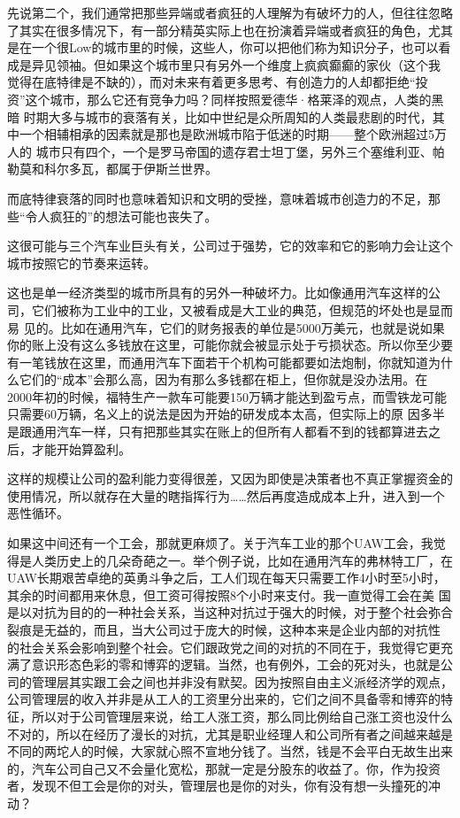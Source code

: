 先说第二个，我们通常把那些异端或者疯狂的人理解为有破坏力的人，但往往忽略了其实在很多情况下，有一部分精英实际上也在扮演着异端或者疯狂的角色，尤其
是在一个很Low的城市里的时候，这些人，你可以把他们称为知识分子，也可以看成是异见领袖。但如果这个城市里只有另外一个维度上疯疯癫癫的家伙（这个我
觉得在底特律是不缺的），而对未来有着更多思考、有创造力的人却都拒绝``投资''这个城市，那么它还有竞争力吗？同样按照爱德华·格莱泽的观点，人类的黑暗
时期大多与城市的衰落有关，比如中世纪是众所周知的人类最悲剧的时代，其中一个相辅相承的因素就是那也是欧洲城市陷于低迷的时期------整个欧洲超过5万人的
城市只有四个，一个是罗马帝国的遗存君士坦丁堡，另外三个塞维利亚、帕勒莫和科尔多瓦，都属于伊斯兰世界。

而底特律衰落的同时也意味着知识和文明的受挫，意味着城市创造力的不足，那些``令人疯狂的''的想法可能也丧失了。

这很可能与三个汽车业巨头有关，公司过于强势，它的效率和它的影响力会让这个城市按照它的节奏来运转。

这也是单一经济类型的城市所具有的另外一种破坏力。比如像通用汽车这样的公司，它们被称为工业中的工业，又被看成是大工业的典范，但规范的坏处也是显而易
见的。比如在通用汽车，它们的财务报表的单位是5000万美元，也就是说如果你的账上没有这么多钱放在这里，可能你就会被显示处于亏损状态。所以你至少要
有一笔钱放在这里，而通用汽车下面若干个机构可能都要如法炮制，你就知道为什么它们的``成本''会那么高，因为有那么多钱都在柜上，但你就是没办法用。在
2000年初的时候，福特生产一款车可能要150万辆才能达到盈亏点，而雪铁龙可能只需要60万辆，名义上的说法是因为开始的研发成本太高，但实际上的原
因多半是跟通用汽车一样，只有把那些其实在账上的但所有人都看不到的钱都算进去之后，才能开始算盈利。

这样的规模让公司的盈利能力变得很差，又因为即使是决策者也不真正掌握资金的使用情况，所以就存在大量的瞎指挥行为\ldots{}\ldots{}然后再度造成成本上升，进入到一个恶性循环。

如果这中间还有一个工会，那就更麻烦了。关于汽车工业的那个UAW工会，我觉得是人类历史上的几朵奇葩之一。举个例子说，比如在通用汽车的弗林特工厂，在
UAW长期艰苦卓绝的英勇斗争之后，工人们现在每天只需要工作4小时至5小时，其余的时间都用来休息，但工资可得按照8个小时来支付。我一直觉得工会在美
国是以对抗为目的的一种社会关系，当这种对抗过于强大的时候，对于整个社会弥合裂痕是无益的，而且，当大公司过于庞大的时候，这种本来是企业内部的对抗性
的社会关系会影响到整个社会。它们跟政党之间的对抗的不同在于，我觉得它更充满了意识形态色彩的零和博弈的逻辑。当然，也有例外，工会的死对头，也就是公
司的管理层其实跟工会之间也并非没有默契。因为按照自由主义派经济学的观点，公司管理层的收入并非是从工人的工资里分出来的，它们之间不具备零和博弈的特
征，所以对于公司管理层来说，给工人涨工资，那么同比例给自己涨工资也没什么不对的，所以在经历了漫长的对抗，尤其是职业经理人和公司所有者之间越来越是
不同的两坨人的时候，大家就心照不宣地分钱了。当然，钱是不会平白无故生出来的，汽车公司自己又不会量化宽松，那就一定是分股东的收益了。你，作为投资
者，发现不但工会是你的对头，管理层也是你的对头，你有没有想一头撞死的冲动？

